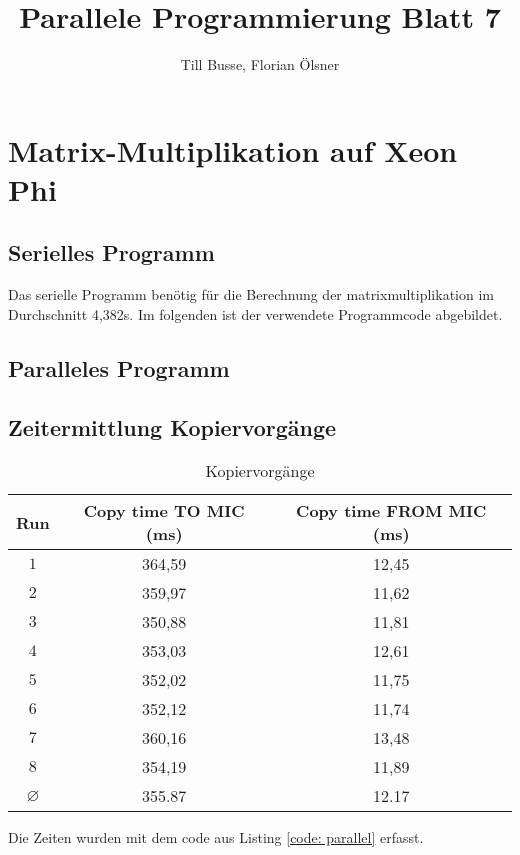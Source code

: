 \documentclass[12pt,a4paper]{article}
\author{Till Busse, Florian Ölsner}
\title{Parallele Programmierung Blatt 7}
\begin{document}
\maketitle
\pagebreak
\section{Matrix-Multiplikation auf Xeon Phi}
\subsection{Serielles Programm}
Das serielle Programm benötig für die Berechnung der matrixmultiplikation im Durchschnitt 4,382s. Im folgenden ist der verwendete Programmcode abgebildet.

\pagebreak
\subsection{Paralleles Programm}

\subsection{Zeitermittlung Kopiervorgänge}
\begin{table}[H]
  \begin{tabular}{|c|c|c|} \hline
    \textbf{Run} & \textbf{Copy time TO MIC (ms)} & \textbf{Copy time FROM MIC (ms)} \\\hline
    $1$ & 364,59 & 12,45 \\\hline
    $2$ & 359,97 & 11,62 \\\hline
    $3$ & 350,88 & 11,81 \\\hline
    $4$ & 353,03 & 12,61 \\\hline
    $5$ & 352,02 & 11,75 \\\hline
    $6$ & 352,12 & 11,74 \\\hline
    $7$ & 360,16 & 13,48 \\\hline
    $8$ & 354,19 & 11,89 \\\hline
    $\diameter$ & 355.87 & 12.17 \\\hline
  \end{tabular}
  \caption{Kopiervorgänge}
  \label{table:kopiervorgänge}
\end{table}
Die Zeiten wurden mit dem code aus Listing \ref{code: parallel} erfasst.
\end{document}
